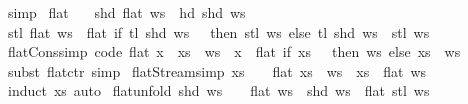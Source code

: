 \begin{isabellebody}
\ simp%
\endisatagproof
{\isafoldproof}%
%
\isadelimproof
%
\endisadelimproof
%
\isadelimdocument
%
\endisadelimdocument
%
\isatagdocument
%
\isamarkuptrue%
%
\endisatagdocument
{\isafolddocument}%
%
\isadelimdocument
%
\endisadelimdocument
{}\isamarkupfalse%
\ flat\ \isanewline
\ \ {\isachardoublequoteopen}shd\ {\isacharparenleft}flat\ ws{\isacharparenright}\ {\isacharequal}\ hd\ {\isacharparenleft}shd\ ws{\isacharparenright}{\isachardoublequoteclose}\isanewline
{\isacharbar}\ {\isachardoublequoteopen}stl\ {\isacharparenleft}flat\ ws{\isacharparenright}\ {\isacharequal}\ flat\ {\isacharparenleft}if\ tl\ {\isacharparenleft}shd\ ws{\isacharparenright}\ {\isacharequal}\ {\isacharbrackleft}{\isacharbrackright}\ then\ stl\ ws\ else\ tl\ {\isacharparenleft}shd\ ws{\isacharparenright}\ {\isacharhash}{\isacharhash}\ stl\ ws{\isacharparenright}{\isachardoublequoteclose}\isanewline
\isanewline
{}\isamarkupfalse%
\ flat{\isacharunderscore}Cons{\isacharbrackleft}simp{\isacharcomma}\ code{\isacharbrackright}{\isacharcolon}\ {\isachardoublequoteopen}flat\ {\isacharparenleft}{\isacharparenleft}x\ {\isacharhash}\ xs{\isacharparenright}\ {\isacharhash}{\isacharhash}\ ws{\isacharparenright}\ {\isacharequal}\ x\ {\isacharhash}{\isacharhash}\ flat\ {\isacharparenleft}if\ xs\ {\isacharequal}\ {\isacharbrackleft}{\isacharbrackright}\ then\ ws\ else\ xs\ {\isacharhash}{\isacharhash}\ ws{\isacharparenright}{\isachardoublequoteclose}\isanewline
%
\isadelimproof
\ \ %
\endisadelimproof
%
\isatagproof
{}\isamarkupfalse%
\ {\isacharparenleft}subst\ flat{\isachardot}ctr{\isacharparenright}\ simp%
\endisatagproof
{\isafoldproof}%
%
\isadelimproof
\isanewline
%
\endisadelimproof
\isanewline
{}\isamarkupfalse%
\ flat{\isacharunderscore}Stream{\isacharbrackleft}simp{\isacharbrackright}{\isacharcolon}\ {\isachardoublequoteopen}xs\ {\isasymnoteq}\ {\isacharbrackleft}{\isacharbrackright}\ {\isasymLongrightarrow}\ flat\ {\isacharparenleft}xs\ {\isacharhash}{\isacharhash}\ ws{\isacharparenright}\ {\isacharequal}\ xs\ {\isacharat}{\isacharminus}\ flat\ ws{\isachardoublequoteclose}\isanewline
%
\isadelimproof
\ \ %
\endisadelimproof
%
\isatagproof
{}\isamarkupfalse%
\ {\isacharparenleft}induct\ xs{\isacharparenright}\ auto%
\endisatagproof
{\isafoldproof}%
%
\isadelimproof
\isanewline
%
\endisadelimproof
\isanewline
{}\isamarkupfalse%
\ flat{\isacharunderscore}unfold{\isacharcolon}\ {\isachardoublequoteopen}shd\ ws\ {\isasymnoteq}\ {\isacharbrackleft}{\isacharbrackright}\ {\isasymLongrightarrow}\ flat\ ws\ {\isacharequal}\ shd\ ws\ {\isacharat}{\isacharminus}\ flat\ {\isacharparenleft}stl\ ws{\isacharparenright}{\isachardoublequoteclose}\isanewline

\end{isabellebody}
